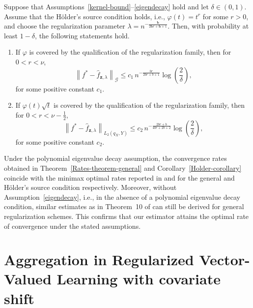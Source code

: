 \documentclass[twoside,11pt]{article}
\begin{document}
\begin{corollary}\label{Holder-corollary}
Suppose that Assumptions~\ref{kernel-bound}--\ref{eigendecay} hold and let
$\delta \in (0,1)$. 
Assume that the Hölder's source condition holds, i.e.,
$\varphi(t)=t^r$ for some $r>0$,
and choose the regularization parameter
$\lambda = n^{-\frac{\mathbf b}{2\mathbf b r+\mathbf b+1}}$.
Then, with probability at least $1-\delta$, the following statements hold.
\begin{enumerate}
\renewcommand{\labelenumi}{(\roman{enumi})}

\item
If $\varphi$ is covered by the qualification of the regularization family, then for $0<r<\nu$,
\[
\left\|f^*-\widehat{f}_{\mathbf z,\lambda}\right\|_{\mathcal G}
\le
c_1\,
n^{-\frac{b r}{2 b r+b+1}}
\log\!\left(\frac{2}{\delta}\right),
\]
for some positive constant $c_1$.

\item
If $\varphi(t)\sqrt{t}$ is covered by the qualification of the regularization family, then for $0<r<\nu-\frac12$,
\[
\left\|f^*-\widehat{f}_{\mathbf z,\lambda}\right\|_{L_2(q_X,Y)}
\le
c_2\,
n^{-\frac{2 b r+b}{4 b r+2 b+2}}
\log\!\left(\frac{2}{\delta}\right),
\]
for some positive constant $c_2$.

\end{enumerate}

\end{corollary}

\begin{remark}
Under the polynomial eigenvalue decay assumption, the convergence rates obtained in
Theorem~\ref{Rates-theorem-general} and Corollary~\ref{Holder-corollary} coincide with the
minimax optimal rates reported in \cite{rastogi2017optimal} and
\cite{blanchard2016optimalratesHolders} for the general and Hölder's source condition
respectively. Moreover, without Assumption~\ref{eigendecay}, i.e., in the absence of a
polynomial eigenvalue decay condition, similar estimates as in Theorem~10 of \cite{regularization} can still be derived for
general regularization schemes. 
This confirms that our estimator attains the optimal rate of convergence under the stated assumptions.
\end{remark}


\section{Aggregation in Regularized Vector-Valued Learning  with covariate shift
}\label{Aggregation}
\end{document}

